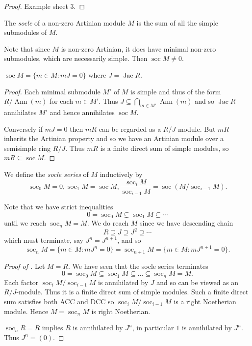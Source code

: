\documentclass[a4paper]{article}
\DeclareMathOperator{\Ann}{Ann} %
\DeclareMathOperator{\jac}{Jac} %
\DeclareMathOperator{\soc}{soc} %
\begin{document}
\begin{proof}
  Example sheet 3.
\end{proof}

\begin{definition}[socle]
  The \emph{socle} of a non-zero Artinian module \(M\) is the sum of all the simple submodules of \(M\).
\end{definition}

Note that since \(M\) is non-zero Artinian, it does have minimal non-zero submodules, which are necessarily simple. Then \(\soc M \neq 0\).

\begin{lemma}
  \(\soc M = \{m \in M: mJ = 0\}\) where \(J = \jac R\).
\end{lemma}

\begin{proof}
  Each minimal submodule \(M'\) of \(M\) is simple and thus of the form \(R/\Ann(m)\) for each \(m \in M'\). Thus \(J \subseteq \bigcap_{m \in M'} \Ann(m)\) and so \(\jac R\) annihilates \(M'\) and hence annihilates \(\soc M\).

  Conversely if \(mJ = 0\) then \(mR\) can be regarded as a \(R/J\)-module. But \(mR\) inherits the Artinian property and so we have an Artinian module over a semisimple ring \(R/J\). Thus \(mR\) is a finite direct sum of simple modules, so \(mR \subseteq \soc M\).
\end{proof}

\begin{definition}
  We define the \emph{socle series} of \(M\) inductively by
  \[
    \soc_0 M = 0, \soc_1 M = \soc M, \frac{\soc_i M}{\soc_{i - 1} M} = \soc (M/\soc_{i - 1} M).
  \]
\end{definition}

Note that we have strict inequalities
\[
  0 = \soc_0 M \subsetneq \soc_1 M \subsetneq \cdots
\]
until we reach \(\soc_n M = M\). We do reach \(M\) since we have descending chain
\[
  R \supseteq J \supseteq J^2 \supseteq \cdots
\]
which must terminate, say \(J^n = J^{n + 1}\), and so
\[
  \soc_n M = \{m \in M: mJ^n = 0\} = \soc_{n + 1} M = \{m \in M: mJ^{n + 1} = 0\}.
\]

\begin{proof}[Proof of ]
  Let \(M = R\). We have seen that the socle series terminates
  \[
    0 = \soc_0 M \subseteq \soc_1 M \subseteq \dots \subseteq \soc_n M = M.
  \]
  Each factor \(\soc_i M/\soc_{i - 1} M\) is annihilated by \(J\) and so can be viewed as an \(R/J\)-module. Thus it is a finite direct sum of simple modules. Such a finite direct sum satisfies both ACC and DCC so \(\soc_i M/\soc_{i - 1} M\) is a right Noetherian module. Hence \(M = \soc_n M\) is right Noetherian.

  \(\soc_n R = R\) implies \(R\) is annihilated by \(J^n\), in particular \(1\) is annihilated by \(J^n\). Thus \(J^n = (0)\).
\end{proof}
\end{document}
